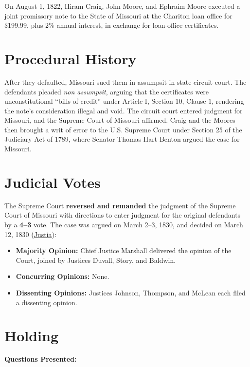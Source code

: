 \documentclass[12pt]{article}
\begin{document}
On August 1, 1822, Hiram Craig, John Moore, and Ephraim Moore executed a joint promissory note to the State of Missouri at the Chariton loan office for \$199.99, plus 2\% annual interest, in exchange for loan-office certificates.

\section{Procedural History}
After they defaulted, Missouri sued them in assumpsit in state circuit court. The defendants pleaded \textit{non assumpsit}, arguing that the certificates were unconstitutional ``bills of credit'' under Article I, Section 10, Clause 1, rendering the note's consideration illegal and void. The circuit court entered judgment for Missouri, and the Supreme Court of Missouri affirmed. Craig and the Moores then brought a writ of error to the U.S. Supreme Court under Section 25 of the Judiciary Act of 1789, where Senator Thomas Hart Benton argued the case for Missouri.

\section{Judicial Votes}
The Supreme Court \textbf{reversed and remanded} the judgment of the Supreme Court of Missouri with directions to enter judgment for the original defendants by a \textbf{4--3} vote. The case was argued on March 2--3, 1830, and decided on March 12, 1830 (\href{https://supreme.justia.com/cases/federal/us/29/410/}{Justia}):

\begin{itemize}
    \item \textbf{Majority Opinion:} Chief Justice Marshall delivered the opinion of the Court, joined by Justices Duvall, Story, and Baldwin.
    \item \textbf{Concurring Opinions:} None.
    \item \textbf{Dissenting Opinions:} Justices Johnson, Thompson, and McLean each filed a dissenting opinion.
\end{itemize}

\section{Holding}
\textbf{Questions Presented:}
\end{document}

